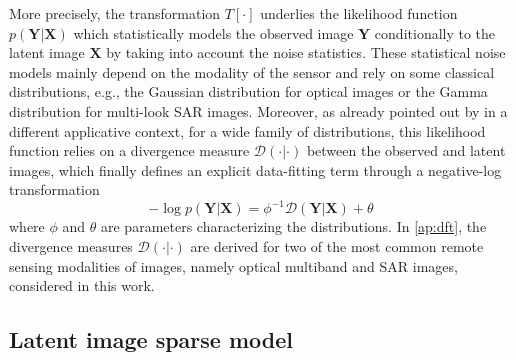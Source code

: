 \documentclass[review]{elsarticle}
\begin{document}
More precisely, the transformation $\mathit{T}[\cdot]$ underlies the likelihood function $p(\mathbf{Y}|\mathbf{X})$  which statistically models the observed image $\mathbf{Y}$ conditionally to the latent image $\mathbf{X}$ by taking into account the noise statistics. These statistical noise models mainly depend on the modality of the sensor and rely on some classical distributions, e.g., the Gaussian distribution for optical images or the Gamma distribution for multi-look SAR images. Moreover, as already pointed out by \citet{fevotte_nonnegative_2009} in a different applicative context, for a wide family of distributions, this likelihood function relies on a divergence measure $\mathcal{D}(\cdot|\cdot)$ between the observed and latent images, which finally defines an explicit data-fitting term through a negative-log transformation
%
\begin{equation}
			- \log p(\mathbf{Y}|\mathbf{X}) = \phi^{-1} \mathcal{D}(\mathbf{Y}|\mathbf{X}) + \theta
\end{equation}
%
where $\phi$ and $\theta$ are parameters characterizing the distributions. In \ref{ap:dft}, the divergence measures $\mathcal{D}(\cdot|\cdot)$ are derived for two of the most common remote sensing modalities of images, namely optical multiband and SAR images, considered in this work.


\subsection{Latent image sparse model}\label{subsec:sparse_model}
\end{document}
